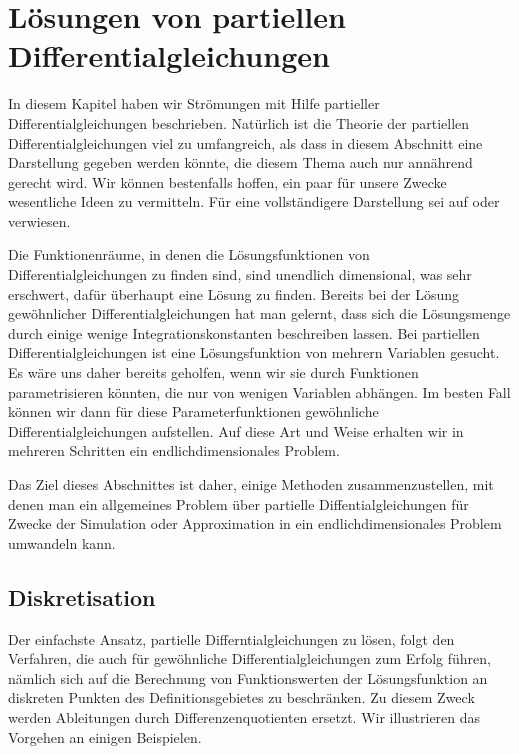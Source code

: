 %
%
%
\section{Lösungen von partiellen Differentialgleichungen%
\label{section:pdeloesungen}}
In diesem Kapitel haben wir Strömungen mit Hilfe partieller
Differentialgleichungen beschrieben.
Natürlich ist die Theorie der partiellen Differentialgleichungen viel
zu umfangreich, als dass in diesem Abschnitt eine Darstellung gegeben
werden könnte, die diesem Thema auch nur annährend gerecht wird.
Wir können bestenfalls hoffen, ein paar für unsere Zwecke wesentliche
Ideen zu vermitteln.
Für eine vollständigere Darstellung sei auf \cite{skript:pde}
oder \cite{skript:part-diff} verwiesen.

Die Funktionenräume, in denen die Lösungsfunktionen von Differentialgleichungen
zu finden sind, sind unendlich dimensional, was sehr erschwert,
dafür überhaupt eine Lösung zu finden.
Bereits bei der Lösung gewöhnlicher Differentialgleichungen hat man
gelernt, dass sich die Lösungsmenge durch einige wenige Integrationskonstanten
beschreiben lassen.
Bei partiellen Differentialgleichungen ist eine Lösungsfunktion von
mehrern Variablen gesucht.
Es wäre uns daher bereits geholfen, wenn wir sie durch
Funktionen parametrisieren könnten, die nur von wenigen Variablen
abhängen.
Im besten Fall können wir dann für diese Parameterfunktionen gewöhnliche
Differentialgleichungen aufstellen.
Auf diese Art und Weise erhalten wir in mehreren Schritten ein
endlichdimensionales Problem.

Das Ziel dieses Abschnittes ist daher, einige Methoden zusammenzustellen,
mit denen man ein allgemeines Problem über partielle Diffentialgleichungen
für Zwecke der Simulation oder Approximation
in ein endlichdimensionales Problem umwandeln kann.

\subsection{Diskretisation\label{section:diskretisation}}
Der einfachste Ansatz, partielle Differntialgleichungen zu lösen,
folgt den Verfahren, die auch für gewöhnliche Differentialgleichungen
\cite{skript:mathsem-dgl} 
zum Erfolg führen, nämlich sich auf die Berechnung von Funktionswerten
der Lösungsfunktion an diskreten Punkten des Definitionsgebietes zu
beschränken.
Zu diesem Zweck werden Ableitungen durch Differenzenquotienten ersetzt.
Wir illustrieren das Vorgehen an einigen Beispielen.

